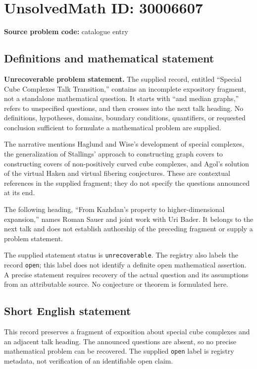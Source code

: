 \documentclass[11pt]{article}
\begin{document}
\section*{UnsolvedMath ID: 30006607}
\textbf{Source problem code:} catalogue entry
\subsection{Definitions and mathematical statement}
\textbf{Unrecoverable problem statement.} The supplied record, entitled ``Special Cube Complexes Talk Transition,'' contains an incomplete expository fragment, not a standalone mathematical question. It starts with ``and median graphs,'' refers to unspecified questions, and then crosses into the next talk heading. No definitions, hypotheses, domains, boundary conditions, quantifiers, or requested conclusion sufficient to formulate a mathematical problem are supplied.

The narrative mentions Haglund and Wise's development of special complexes, the generalization of Stallings' approach to constructing graph covers to constructing covers of non-positively curved cube complexes, and Agol's solution of the virtual Haken and virtual fibering conjectures. These are contextual references in the supplied fragment; they do not specify the questions announced at its end.

The following heading, ``From Kazhdan's property to higher-dimensional expansion,'' names Roman Sauer and joint work with Uri Bader. It belongs to the next talk and does not establish authorship of the preceding fragment or supply a problem statement.

The supplied statement status is \texttt{unrecoverable}. The registry also labels the record \texttt{open}; this label does not identify a definite open mathematical assertion. A precise statement requires recovery of the actual question and its assumptions from an attributable source. No conjecture or theorem is formulated here.
\subsection{Short English statement}
This record preserves a fragment of exposition about special cube complexes and an adjacent talk heading. The announced questions are absent, so no precise mathematical problem can be recovered. The supplied \texttt{open} label is registry metadata, not verification of an identifiable open claim.
\end{document}
